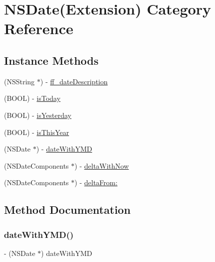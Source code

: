 \hypertarget{category_n_s_date_07_extension_08}{}\section{N\+S\+Date(Extension) Category Reference}
\label{category_n_s_date_07_extension_08}
\subsection*{Instance Methods}
\begin{DoxyCompactItemize}
\item 
(N\+S\+String $\ast$) -\/ \mbox{\hyperlink{category_n_s_date_07_extension_08_af5f3353fd9e43a477a49ba24077dbfb8}{ff\+\_\+date\+Description}}
\item 
(B\+O\+OL) -\/ \mbox{\hyperlink{category_n_s_date_07_extension_08_ade9d65de41cd69aee4773827f7399636}{is\+Today}}
\item 
(B\+O\+OL) -\/ \mbox{\hyperlink{category_n_s_date_07_extension_08_af5ff9da017719ae7291510bd099f95c3}{is\+Yesterday}}
\item 
(B\+O\+OL) -\/ \mbox{\hyperlink{category_n_s_date_07_extension_08_ad3f3bdead59789ff6279f9c25c4dc419}{is\+This\+Year}}
\item 
(N\+S\+Date $\ast$) -\/ \mbox{\hyperlink{category_n_s_date_07_extension_08_adf59848f31a11d418c7fb4c72e0c243f}{date\+With\+Y\+MD}}
\item 
(N\+S\+Date\+Components $\ast$) -\/ \mbox{\hyperlink{category_n_s_date_07_extension_08_af9dad03178e4542299133b9463069953}{delta\+With\+Now}}
\item 
(N\+S\+Date\+Components $\ast$) -\/ \mbox{\hyperlink{category_n_s_date_07_extension_08_a250ade5ba1e474c78557633670ad6e9d}{delta\+From\+:}}
\end{DoxyCompactItemize}


\subsection{Method Documentation}
\mbox{\label{category_n_s_date_07_extension_08_adf59848f31a11d418c7fb4c72e0c243f}} 
\subsubsection{\texorpdfstring{date\+With\+Y\+M\+D()}{dateWithYMD()}}
{\footnotesize\ttfamily -\/ (N\+S\+Date $\ast$) date\+With\+Y\+MD \begin{DoxyParamCaption}{ }\end{DoxyParamCaption}}

